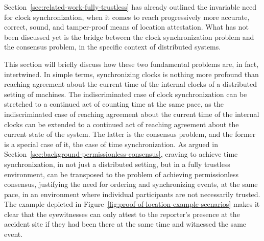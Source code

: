 Section~\ref{sec:related-work-fully-trustless} has already outlined the invariable need for clock synchronization, when it comes to reach progressively more accurate, correct, sound, and tamper-proof means of location attestation. What has not been discussed yet is the bridge between the clock synchronization problem and the consensus problem, in the specific context of distributed systems. 

This section will briefly discuss how these two fundamental problems are, in fact, intertwined. In simple terms, synchronizing clocks is nothing more profound than reaching agreement about the current time of the internal clocks of a distributed setting of machines. The indiscriminated case of clock synchronization can be stretched to a continued act of counting time at the same pace, as the indiscriminated case of reaching agreement about the current time of the internal clocks can be extended to a continued act of reaching agreement about the current state of the system. The latter is the consensus problem, and the former is a special case of it, the case of time synchronization. As argued in Section~\ref{sec:background-permissionless-consensus}, craving to achieve time synchronization, in not just a distributed setting, but in a fully trustless environment, can be transposed to the problem of achieving permissionless consensus, justifying the need for ordering and synchronizing events, at the same pace, in an environment where individual participants are not necessarily trusted. The example depicted in Figure~\ref{fig:proof-of-location-example-scenarios} makes it clear that the eyewitnesses can only attest to the reporter's presence at the accident site if they had been there at the same time and witnessed the same event.

